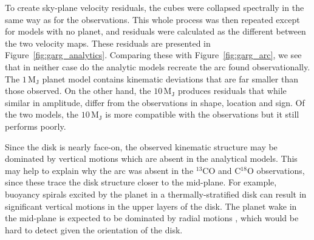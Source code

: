 To create sky-plane velocity residuals, the cubes were collapsed spectrally in the same way as for the observations.
This whole process was then repeated except for models with no planet, and residuals were calculated as the different between the two velocity maps.
These residuals are presented in Figure~\ref{fig:garg_analytics}.
Comparing these with Figure~\ref{fig:garg_arc}, we see that in neither case do the analytic models recreate the arc found observationally.
The $1 \, \mathrm{M_J}$ planet model contains kinematic deviations that are far smaller than those observed.
On the other hand, the $10 \, \mathrm{M_J}$ produces residuals that while similar in amplitude, differ from the observations in shape, location and sign.
Of the two models, the $10 \, \mathrm{M_J}$ is more compatible with the observations but it still performs poorly.

Since the disk is nearly face-on, the observed kinematic structure may be dominated by vertical motions which are absent in the analytical models.
This may help to explain why the arc was absent in the $^{13}$CO and C$^{18}$O observations, since these trace the disk structure closer to the mid-plane.
For example, buoyancy spirals \citep{zhu2012,bae2021} excited by the planet in a thermally-stratified disk can result in significant vertical motions in the upper layers of the disk.
The planet wake in the mid-plane is expected to be dominated by radial motions \citep{rafikov2002a}, which would be hard to detect given the orientation of the disk.

